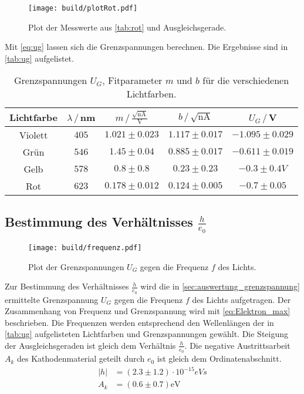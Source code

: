 \begin{figure}[H]
  \centering
  \texttt{[image: build/plotRot.pdf]}
  \caption{Plot der Messwerte aus \autoref{tab:rot} und Ausgleichsgerade.}
  \label{fig:plot_rot}
\end{figure}

Mit \autoref{eq:ug} lassen sich die Grenzspannungen berechnen. Die Ergebnisse sind in \autoref{tab:ug} aufgelistet.
\begin{table}
  \centering
  \begin{tabular}{|c|c|c|c|c|}
    \toprule
    Lichtfarbe & $λ\,/\,$nm & $m\,/\,\frac{\sqrt{\text{nA}}}{\text{V}}$ & $b\,/\,\sqrt{\text{nA}}$ & $U_G\,/\,$V\\
    \midrule
    Violett & $405$ & $1.021\pm 0.023$ & $1.117\pm 0.017$ & $-1.095\pm 0.029$\\
    Grün & $546$ & $1.45\pm 0.04$ & $0.885\pm 0.017$ & $-0.611\pm 0.019$\\
    Gelb & $578$ & $0.8\pm 0.8$ & $0.23\pm 0.23$ & $-0.3\pm 0.4V$\\
    Rot & $623$ & $0.178\pm 0.012$ & $0.124\pm 0.005$ & $-0.7\pm 0.05$\\
    \bottomrule
  \end{tabular}
  \caption{Grenzspannungen $U_G$, Fitparameter $m$ und $b$ für die verschiedenen Lichtfarben.}
  \label{tab:ug}
\end{table}
  

\newpage

\subsection{Bestimmung des Verhältnisses $\frac{h}{e_0}$}

\begin{figure}
  \centering
  \texttt{[image: build/frequenz.pdf]}
  \caption{Plot der Grenzspannungen $U_G$ gegen die Frequenz $f$ des Lichts.}
  \label{fig:frequenz}
\end{figure}

Zur Bestimmung des Verhältnisses $\frac{h}{e_0}$ wird die in \autoref{sec:auswertung_grenzspannung} ermittelte Grenzspannung $U_G$
gegen die Frequenz $f$ des Lichts aufgetragen. 
Der Zusammenhang von Frequenz und Grenzspannung wird mit \autoref{eq:Elektron_max} beschrieben.
Die Frequenzen werden entsprechend den Wellenlängen der in \autoref{tab:ug} aufgelisteten
Lichtfarben und Grenzspannungen gewählt. Die Steigung der Ausgleichsgeraden ist gleich dem Verhältnis $\frac{h}{e_0}$.
Die negative Austrittsarbeit $A_k$ des Kathodenmaterial geteilt durch $e_0$ ist gleich dem Ordinatenabschnitt.
\begin{align}
  |h| &= (2.3\pm 1.2) \cdot 10^{-15} \si{eVs} \\
  A_k &= (0.6\pm 0.7) \si{\eV}
\end{align}

